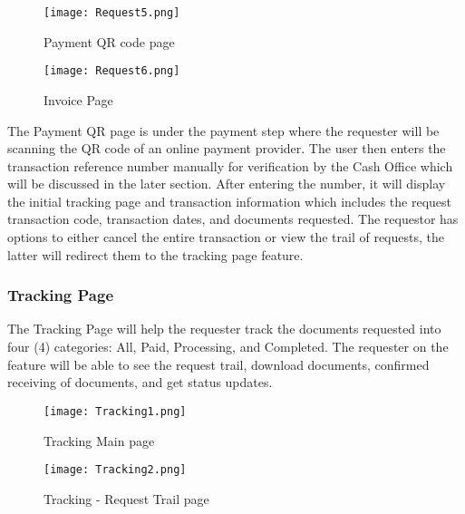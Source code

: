     \begin{figure}[h]
        \centering 
        \begin{minipage}[c]{0.5\linewidth}
            \centering
            \texttt{[image: Request5.png]}
            \caption{Payment QR code page}
            \label{fig:Request5}
        \end{minipage}\hfill
        \begin{minipage}[c]{0.5\linewidth}
            \centering
            \texttt{[image: Request6.png]}
            \caption{Invoice Page}
            \label{fig:Request6}
        \end{minipage}
    \end{figure}

The Payment QR page is under the payment step where the requester will be scanning the QR code of an online payment provider. The user then enters the transaction reference number manually for verification by the Cash Office which will be discussed in the later section. After entering the number, it will display the initial tracking page and transaction information which includes the request transaction code, transaction dates, and documents requested. The requestor has options to either cancel the entire transaction or view the trail of requests, the latter will redirect them to the tracking page feature.

\subsubsection{Tracking Page}

The Tracking Page will help the requester track the documents requested into four (4) categories: All, Paid, Processing, and Completed.  The requester on the feature will be able to see the request trail, download documents, confirmed receiving of documents, and get status updates.

    \begin{figure}[h]
        \centering 
        \begin{minipage}[c]{0.5\linewidth}
            \centering
            \texttt{[image: Tracking1.png]}
            \caption{Tracking Main page}
            \label{fig:Tracking1}
        \end{minipage}\hfill
        \begin{minipage}[c]{0.5\linewidth}
            \centering
            \texttt{[image: Tracking2.png]}
            \caption{Tracking - Request Trail page}
            \label{fig:Tracking2}
        \end{minipage}
    \end{figure}

